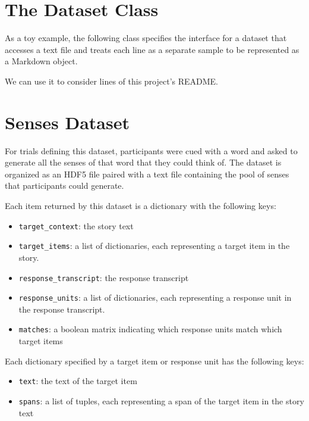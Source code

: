 \documentclass[
  letterpaper,
  DIV=11,
  numbers=noendperiod]{scrreprt}
\providecommand{\tightlist}{%
  \setlength{\itemsep}{0pt}\setlength{\parskip}{0pt}}\usepackage{longtable,booktabs,array}
\begin{document}
\hypertarget{the-dataset-class}{%
\section{The Dataset Class}\label{the-dataset-class}}

As a toy example, the following class specifies the interface for a
dataset that accesses a text file and treats each line as a separate
sample to be represented as a Markdown object.

We can use it to consider lines of this project's README.

\hypertarget{senses-dataset}{%
\section{Senses Dataset}\label{senses-dataset}}

For trials defining this dataset, participants were cued with a word and
asked to generate all the senses of that word that they could think of.
The dataset is organized as an HDF5 file paired with a text file
containing the pool of senses that participants could generate.

Each item returned by this dataset is a dictionary with the following
keys:

\begin{itemize}
\tightlist
\item
  \texttt{target\_context}: the story text
\item
  \texttt{target\_items}: a list of dictionaries, each representing a
  target item in the story.
\item
  \texttt{response\_transcript}: the response transcript\\
\item
  \texttt{response\_units}: a list of dictionaries, each representing a
  response unit in the response transcript.
\item
  \texttt{matches}: a boolean matrix indicating which response units
  match which target items
\end{itemize}

Each dictionary specified by a target item or response unit has the
following keys:

\begin{itemize}
\tightlist
\item
  \texttt{text}: the text of the target item\\
\item
  \texttt{spans}: a list of tuples, each representing a span of the
  target item in the story text
\end{itemize}
\end{document}
